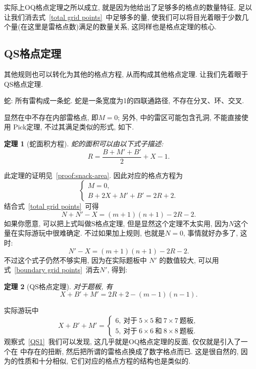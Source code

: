 \documentclass{ctexart}
\newcommand{\varible}[1]{{\Noto[#1]}}
\newtheorem{theorem}{定理}
\begin{document}
实际上OQ格点定理之所以成立, 就是因为他给出了足够多的格点的数量特征, 足以让我们消去式\ \ref{total grid points}\ 中足够多的量, 使我们可以将目光着眼于少数几个量(在这里是雷格点数)满足的数量关系, 这同样也是格点定理的核心.

\subsection{QS格点定理}

其他规则也可以转化为其他的格点方程, 从而构成其他格点定理. 让我们先着眼于 QS格点定理.
\begin{flushleft}
    \varible{S} {\heiti 蛇: 所有雷构成一条蛇. 蛇是一条宽度为1的四联通路径, 不存在分叉、环、交叉.}
\end{flushleft}
显然在\varible{S}中不存在内部雷格点, 即$M = 0$; 另外, \varible{S} 中的雷区可能包含孔洞, 不能直接使用 Pick定理, 不过其满足类似的形式, 如下.
\begin{theorem}[蛇面积方程]
    蛇的面积可以由以下式子描述:
    \begin{equation}
        R = \frac{B + M' + B'}{2} + X - 1.
    \end{equation}
\end{theorem}
此定理的证明见\ \ref{proof:snack-area}.
因此\varible{S}对应的格点方程为
$$
\begin{cases}
    M = 0,\\
    B + 2X + M' + B' = 2R + 2.
\end{cases}
$$
结合式\ \ref{total grid points}\ 可得
$$
N + N' - X = (m+1)(n+1) - 2R - 2.
$$
如果你愿意, 可以把上式叫做S格点定理, 但是显然这个定理不太实用, 因为$N$这个量在实际游玩中很难确定.
不过如果加上规则\varible{Q}, 也就是$N = 0$, 事情就好办多了, 这时:
\begin{equation}
    \label{QS1}
    N' - X= (m+1)(n+1) - 2R - 2.
\end{equation}
不过这个式子仍然不够实用, 因为在实际题板中 $N'$ 的数值较大, 可以用式\ \ref{boundary grid points}\ 消去$N'$, 得到:
\begin{theorem}[QS格点定理]
    对于\varible{Q}\varible{S}题板, 有
    \begin{equation}
       X + B' + M' =2R + 2 - (m-1)(n-1).
    \end{equation}
\end{theorem}
实际游玩中
$$
X + B' + M' = \begin{cases}
    6, \ \text{对于}\ 5\times5\ \text{和}\ 7\times7\ \text{题板},\\
    5, \ \text{对于}\ 6\times6\ \text{和}\ 8\times8\ \text{题板}.
\end{cases}
$$
观察式\ \ref{QS1}\ 我们可以发现, 这几乎就是OQ格点定理的反面, 仅仅就是引入了一个在\varible{S} 中存在的扭断, 然后把所谓的雷格点换成了数字格点而已. 这是很自然的, 因为\varible{O}的性质和\varible{S}十分相似, 它们对应的格点方程的结构也是类似的.
\end{document}

